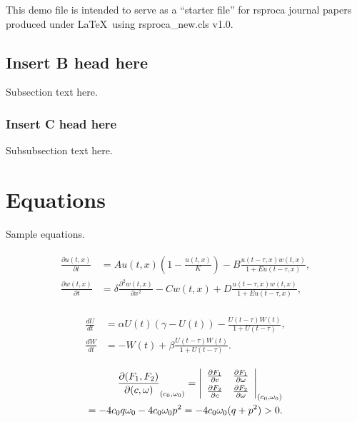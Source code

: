 \documentclass[openacc]{rsproca_new}%
\begin{document}
This demo file is intended to serve as a ``starter file''
for rsproca journal papers produced under \LaTeX\ using
rsproca\_new.cls v1.0.

\subsection{Insert B head here}
Subsection text here.

\subsubsection{Insert C head here}
Subsubsection text here.

\section{Equations}

Sample equations.

\begin{align}\label{1.1}
\begin{split}
\frac{\partial u(t,x)}{\partial t} &= Au(t,x) \left(1-\frac{u(t,x)}{K}\right)-B\frac{u(t-\tau,x) w(t,x)}{1+Eu(t-\tau,x)},\\
\frac{\partial w(t,x)}{\partial t} &=\delta \frac{\partial^2w(t,x)}{\partial x^2}-Cw(t,x)+D\frac{u(t-\tau,x)w(t,x)}{1+Eu(t-\tau,x)},
\end{split}
\end{align}

\begin{align}\label{1.2}
\begin{split}
\frac{dU}{dt} &=\alpha U(t)(\gamma -U(t))-\frac{U(t-\tau)W(t)}{1+U(t-\tau)},\\
\frac{dW}{dt} &=-W(t)+\beta\frac{U(t-\tau)W(t)}{1+U(t-\tau)}.
\end{split}
\end{align}

\begin{eqnarray}
\frac{\partial(F_1,F_2)}{\partial(c,\omega)}_{(c_0,\omega_0)} = \left|
\begin{array}{ll}
\frac{\partial F_1}{\partial c} &\frac{\partial F_1}{\partial \omega} \\\noalign{\vskip3pt}
\frac{\partial F_2}{\partial c}&\frac{\partial F_2}{\partial \omega}
\end{array}\right|_{(c_0,\omega_0)}\notag\\
=-4c_0q\omega_0 -4c_0\omega_0p^2 =-4c_0\omega_0(q+p^2)>0.
\end{eqnarray}
\end{document}
